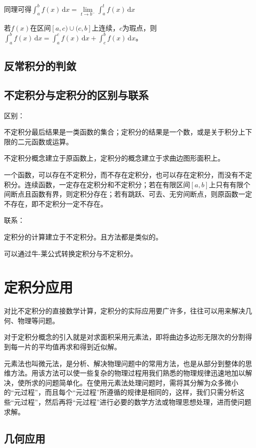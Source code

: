 \documentclass[UTF8, 12pt]{ctexart}
\begin{document}
同理可得$\int_a^bf(x)\,\textrm{d}x=\lim\limits_{t\to b^-}\int_a^tf(x)\,\textrm{d}x$

若$f(x)$在区间$[a,c)\cup(c,b]$上连续，$c$为瑕点，则$\int_a^bf(x)\,\textrm{d}x=\int_a^cf(x)\,\textrm{d}x+\int_c^bf(x)\,\textrm{d}x$。

\subsection{反常积分的判敛}

\subsection{不定积分与定积分的区别与联系}

区别：

不定积分最后结果是一类函数的集合；定积分的结果是一个数，或是关于积分上下限的二元函数或运算。

不定积分概念建立于原函数上，定积分的概念建立于求曲边图形面积上。

一个函数，可以存在不定积分，而不存在定积分，也可以存在定积分，而没有不定积分。连续函数，一定存在定积分和不定积分；若在有限区间$[a,b]$上只有有限个间断点且函数有界，则定积分存在；若有跳跃、可去、无穷间断点，则原函数一定不存在，即不定积分一定不存在。

联系：

定积分的计算建立于不定积分。且方法都是类似的。

可以通过牛-莱公式转换定积分与不定积分。

\section{定积分应用}

对比不定积分的直接数学计算，定积分的实际应用要广许多，往往可以用来解决几何、物理等问题。

对于定积分概念的引入就是对求面积采用元素法，即将曲边多边形无限次的分割得到每一片的平均值再求和得到近似解。

元素法也叫微元法，是分析、解决物理问题中的常用方法，也是从部分到整体的思维方法。用该方法可以使一些复杂的物理过程用我们熟悉的物理规律迅速地加以解决，使所求的问题简单化。在使用元素法处理问题时，需将其分解为众多微小的“元过程”，而且每个“元过程”所遵循的规律是相同的，这样，我们只需分析这些“元过程”，然后再将“元过程”进行必要的数学方法或物理思想处理，进而使问题求解。

\subsection{几何应用}
\end{document}
